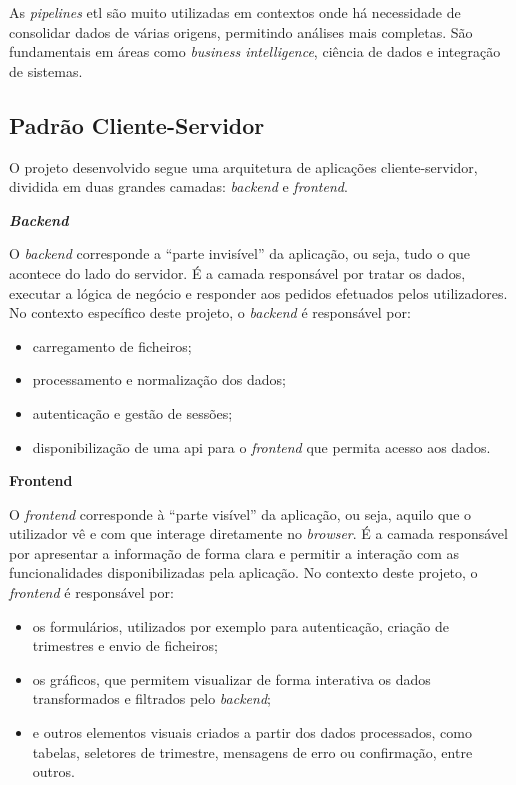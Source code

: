 As \textit{pipelines} \gls{etl} são muito utilizadas em contextos onde há necessidade de consolidar dados de várias origens, permitindo análises mais completas. São fundamentais em áreas como \textit{business intelligence}, ciência de dados e integração de sistemas.


\subsection{Padrão Cliente-Servidor}

O projeto desenvolvido segue uma arquitetura de aplicações cliente-servidor, dividida em duas grandes camadas: \textit{backend} e \textit{frontend}.

\textbf{\textit{Backend}}

O \textit{backend} corresponde a “parte invisível” da aplicação, ou seja, tudo o que acontece do lado do servidor. É a camada responsável por tratar os dados, executar a lógica de negócio e responder aos pedidos efetuados pelos utilizadores. No contexto específico deste projeto, o \textit{backend} é responsável por:

\begin{itemize}
    \item carregamento de ficheiros;
    \item processamento e normalização dos dados;
    \item autenticação e gestão de sessões;
    \item disponibilização de uma \gls{api} para o \textit{frontend} que permita acesso aos dados.
\end{itemize}

\textbf{Frontend}

O \textit{frontend} corresponde à ``parte visível'' da aplicação, ou seja, aquilo que o utilizador vê e com que interage diretamente no \textit{browser}. É a camada responsável por apresentar a informação de forma clara e permitir a interação com as funcionalidades disponibilizadas pela aplicação. No contexto deste projeto, o \textit{frontend} é responsável por:
\begin{itemize}
    \item os formulários, utilizados por exemplo para autenticação, criação de trimestres e envio de ficheiros;
    \item os gráficos, que permitem visualizar de forma interativa os dados transformados e filtrados pelo \textit{backend};
    \item e outros elementos visuais criados a partir dos dados processados, como tabelas, seletores de trimestre, mensagens de erro ou confirmação, entre outros.
\end{itemize}

